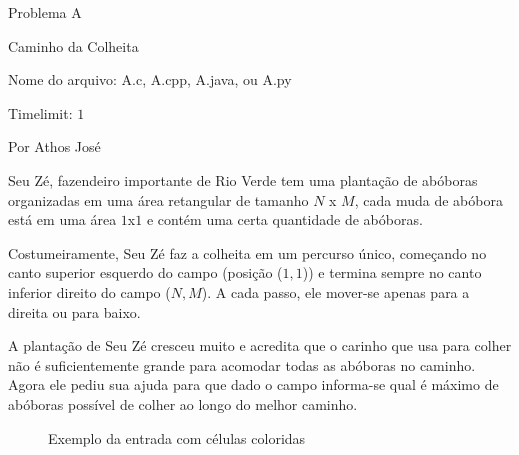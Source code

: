 \begin{center}
Problema A

Caminho da Colheita

{\small Nome do arquivo: A.c, A.cpp, A.java, ou A.py}

{\large Timelimit: $1$}

{\tiny Por Athos José}

\end{center}

Seu Zé, fazendeiro importante de Rio Verde tem uma plantação de abóboras organizadas em uma área retangular de tamanho $N$ x $M$, cada muda de abóbora está em uma área $1$x$1$ e contém uma certa quantidade de abóboras.

Costumeiramente, Seu Zé faz a colheita em um percurso único, começando no canto superior esquerdo do campo (posição ($1,1$)) e termina sempre no canto inferior direito do campo ($N,M$). A cada passo, ele mover-se apenas para a direita ou para baixo.

A plantação de Seu Zé cresceu muito e acredita que o carinho que usa para colher não é suficientemente grande para acomodar todas as abóboras no caminho. Agora ele pediu sua ajuda para que dado o campo informa-se qual é máximo de abóboras possível de colher ao longo do melhor caminho.

\vspace{0.3cm}
\begin{figure}[h]
    \centering
    \caption{Exemplo da entrada com células coloridas}
\end{figure}

